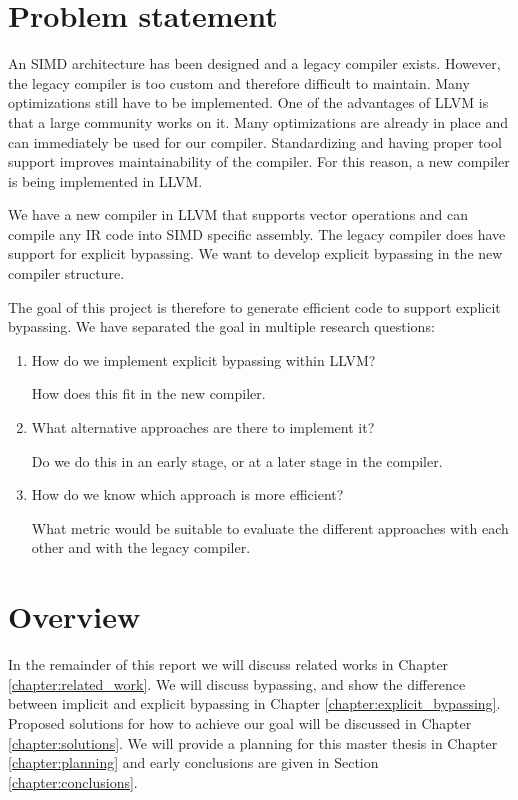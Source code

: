 \section{Problem statement}\label{sec:problem_statement}
An SIMD architecture has been designed and a legacy compiler exists. However, the legacy compiler is too custom and therefore difficult to maintain. Many optimizations still have to be implemented. One of the advantages of LLVM is that a large community works on it. Many optimizations are already in place and can immediately be used for our compiler. Standardizing and having proper tool support improves maintainability of the compiler. %
For this reason, a new compiler is being implemented in LLVM.

We have a new compiler in LLVM that supports vector operations and can compile any IR code into SIMD specific assembly. The legacy compiler does have support for explicit bypassing. We want to develop explicit bypassing in the new compiler structure.

The goal of this project is therefore to generate efficient code to support explicit bypassing. We have separated the goal in multiple research questions:

\begin{enumerate}
\item How do we implement explicit bypassing within LLVM?

How does this fit in the new compiler.
\item What alternative approaches are there to implement it?

Do we do this in an early stage, or at a later stage in the compiler.
\item How do we know which approach is more efficient?

What metric would be suitable to evaluate the different approaches with each other and with the legacy compiler.
\end{enumerate}





\section{Overview}\label{sec:overview}
In the remainder of this report we will discuss related works in Chapter \ref{chapter:related_work}. We will discuss bypassing, and show the difference between implicit and explicit bypassing in Chapter \ref{chapter:explicit_bypassing}. Proposed solutions for how to achieve our goal will be discussed in Chapter \ref{chapter:solutions}. We will provide a planning for this master thesis in Chapter \ref{chapter:planning} and early conclusions are given in Section \ref{chapter:conclusions}.